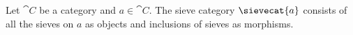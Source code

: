 \begin{definition}
Let $\cat{C}$ be a category 
and $a \in \cat{C}$.
The sieve category $\sievecat{a}$ 
consists of all the sieves on $a$ as objects 
and inclusions of sieves as morphisms.
\end{definition}